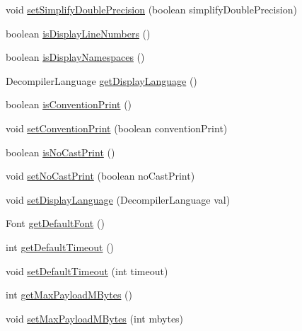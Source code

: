 \begin{DoxyCompactItemize}
void \mbox{\hyperlink{classghidra_1_1app_1_1decompiler_1_1_decompile_options_aa1f94cfbe2db6a1fa619df1526fd656c}{set\+Simplify\+Double\+Precision}} (boolean simplify\+Double\+Precision)
\item 
boolean \mbox{\hyperlink{classghidra_1_1app_1_1decompiler_1_1_decompile_options_aaf7cdc35f70a35bad852ade5ab40a0d7}{is\+Display\+Line\+Numbers}} ()
\item 
boolean \mbox{\hyperlink{classghidra_1_1app_1_1decompiler_1_1_decompile_options_a12283b5df1965867ba288f1ba6241a6f}{is\+Display\+Namespaces}} ()
\item 
Decompiler\+Language \mbox{\hyperlink{classghidra_1_1app_1_1decompiler_1_1_decompile_options_a41e330621e2523726bbfdd596c7096f1}{get\+Display\+Language}} ()
\item 
boolean \mbox{\hyperlink{classghidra_1_1app_1_1decompiler_1_1_decompile_options_a51ff8c8389c1b04b3753e4583f130ebb}{is\+Convention\+Print}} ()
\item 
void \mbox{\hyperlink{classghidra_1_1app_1_1decompiler_1_1_decompile_options_a94f5cfdfb54b4b87010655bbe5cd9709}{set\+Convention\+Print}} (boolean convention\+Print)
\item 
boolean \mbox{\hyperlink{classghidra_1_1app_1_1decompiler_1_1_decompile_options_a426422b38fb7a43288d99e33c0840669}{is\+No\+Cast\+Print}} ()
\item 
void \mbox{\hyperlink{classghidra_1_1app_1_1decompiler_1_1_decompile_options_a107bd7421ca555369a298b60c2398450}{set\+No\+Cast\+Print}} (boolean no\+Cast\+Print)
\item 
void \mbox{\hyperlink{classghidra_1_1app_1_1decompiler_1_1_decompile_options_a3f56ab25e58c3e80f807b42ae1650593}{set\+Display\+Language}} (Decompiler\+Language val)
\item 
Font \mbox{\hyperlink{classghidra_1_1app_1_1decompiler_1_1_decompile_options_abe05e5d8baf6387e61eeee3730b2f25a}{get\+Default\+Font}} ()
\item 
int \mbox{\hyperlink{classghidra_1_1app_1_1decompiler_1_1_decompile_options_a619edd5e5c044dcad26a1a8dbea33018}{get\+Default\+Timeout}} ()
\item 
void \mbox{\hyperlink{classghidra_1_1app_1_1decompiler_1_1_decompile_options_a35af502b44f9aae023f5a684d77dd33c}{set\+Default\+Timeout}} (int timeout)
\item 
int \mbox{\hyperlink{classghidra_1_1app_1_1decompiler_1_1_decompile_options_a690f2f992477fa219d2be6934d6bb88c}{get\+Max\+Payload\+M\+Bytes}} ()
\item 
void \mbox{\hyperlink{classghidra_1_1app_1_1decompiler_1_1_decompile_options_a83fc3795526ec5383ae45c10ec555b48}{set\+Max\+Payload\+M\+Bytes}} (int mbytes)

\end{DoxyCompactItemize}

